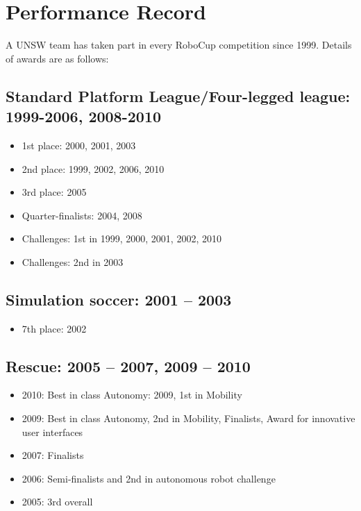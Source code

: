 \documentclass[pdftex,11pt,a4paper]{report}
\begin{document}
\newpage
\chapter{Performance Record}
A UNSW team has taken part in every RoboCup competition since 1999. Details of awards are as follows:
\section{Standard Platform League/Four-legged league: 1999-2006, 2008-2010}
\begin{itemize}
\item 1st place: 2000, 2001, 2003
\item 2nd place: 1999, 2002, 2006, 2010
\item 3rd place: 2005
\item Quarter-finalists: 2004, 2008
\item Challenges: 1st in 1999, 2000, 2001, 2002, 2010
\item Challenges: 2nd in 2003
\end{itemize}
\section{Simulation soccer: 2001 -- 2003}
\begin{itemize}
\item 7th place: 2002
\end{itemize}
\section{Rescue: 2005 -- 2007, 2009 -- 2010}
\begin{itemize}
\item 2010: Best in class Autonomy: 2009, 1st in Mobility
\item 2009: Best in class Autonomy, 2nd in Mobility, Finalists, Award for innovative user interfaces
\item 2007: Finalists 
\item 2006: Semi-finalists and 2nd in autonomous robot challenge
\item 2005: 3rd overall
\end{itemize}
\end{document}
